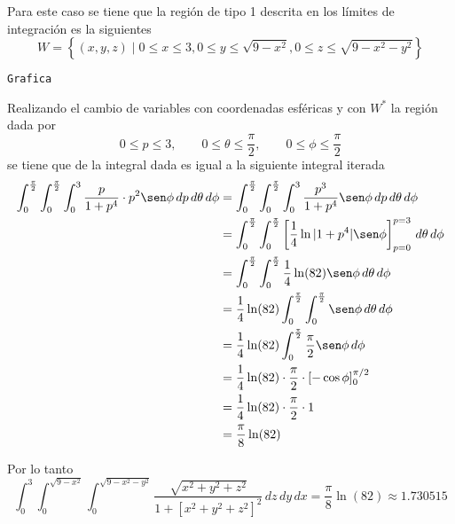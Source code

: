 Para este caso se tiene que la región de tipo 1 descrita en los límites de integración es la siguientes
\[W = \left\{(x, y, z) \mid 0 \leq x \leq 3, 0 \leq y \leq \sqrt{9 - x^2}, 0 \leq z \leq \sqrt{9 - x^2 - y^2}\right\}\]

\texttt{Grafica}

Realizando el cambio de variables con coordenadas esféricas y con $W^*$ la región dada por
\[0 \leq p \leq 3, \qquad 0 \leq \theta \leq \frac{\pi}{2}, \qquad 0 \leq \phi \leq \frac{\pi}{2}\]
se tiene que de la integral dada es igual a la siguiente integral iterada
\begin{align*}
	\int_0^{\frac{\pi}{2}} \int_0^{\frac{\pi}{2}} \int_0^3 \frac{p}{1 + p^4} \cdot p^2 \sen\phi\, dp\, d\theta\, d\phi
	&= \int_0^{\frac{\pi}{2}} \int_0^{\frac{\pi}{2}} \int_0^3 \frac{p^3}{1 + p^4} \sen\phi\, dp\, d\theta\, d\phi\\
	&= \int_0^{\frac{\pi}{2}} \int_0^{\frac{\pi}{2}} \left[\frac{1}{4} \ln|1+p^4| \sen\phi\right]_{p=0}^{p=3}\, d\theta\, d\phi\\
	&= \int_0^{\frac{\pi}{2}} \int_0^{\frac{\pi}{2}} \frac{1}{4} \ln(82) \sen\phi\, d\theta\, d\phi\\
	&= \frac{1}{4} \ln(82) \int_0^{\frac{\pi}{2}} \int_0^{\frac{\pi}{2}} \sen\phi\, d\theta\, d\phi\\
	&= \frac{1}{4} \ln(82) \int_0^{\frac{\pi}{2}} \frac{\pi}{2} \sen\phi \, d\phi\\
	&= \frac{1}{4} \ln(82) \cdot \frac{\pi}{2} \cdot [-\cos\phi]_0^{\pi/2}\\
	&= \frac{1}{4} \ln(82) \cdot \frac{\pi}{2} \cdot 1\\
	&= \frac{\pi}{8} \ln(82)
\end{align*}

Por lo tanto
\[\int_0^3 \int_0^{\sqrt{9 - x^2}} \int_0^{\sqrt{9 - x^2 - y^2}} \frac{\sqrt{x^2 + y^2 + z^2}}{1 + [x^2 + y^2 + z^2]^2}\, dz\, dy\, dx = \frac{\pi}{8} \ln(82) \approx 1.730515\]